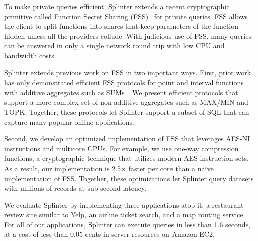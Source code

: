 To make private queries efficient, 
Splinter extends a recent cryptographic primitive called
Function Secret Sharing (FSS)~\cite{fss, gilboa2014distributed} for private queries.
FSS allows the client to split functions into shares that keep parameters of the
function hidden unless all the providers collude.
With judicious use of FSS, many queries can be answered in only a single network round trip
with low CPU and bandwidth costs.

Splinter extends previous work on FSS in two important ways.
First, prior work has only demonstrated efficient FSS protocols for point and interval functions with additive aggregates such as SUMs~\cite{fss}.
We present efficient protocols that support a more complex set of non-additive aggregates such as MAX/MIN and TOPK.
Together, these protocols let Splinter support a subset of SQL that can capture many popular online applications.

Second, we develop an optimized implementation of FSS that leverages AES-NI~\cite{aes-ni} instructions and multicore CPUs.
For example, we use one-way compression functions, a cryptographic technique that utilizes modern AES instruction sets. 
As a result, our implementation is 2.5$\times$ faster per core than a na\"ive implementation of FSS.
Together, these optimizations let Splinter query datasets with millions of records at sub-second latency.

We evaluate Splinter by implementing 
three applications atop it: a restaurant review site similar to Yelp, 
an airline ticket search, and a map routing service.
For all of our applications, Splinter can execute queries in less than 1.6 seconds, at a cost of less than 0.05 cents in server resources on Amazon EC2.


